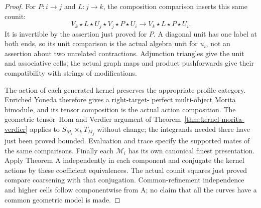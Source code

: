 \documentclass[11pt]{article}
\theoremstyle{definition}
\theoremstyle{remark}
\begin{document}
\begin{proof}
For $P:i\to j$ and $L:j\to k$, the composition comparison inserts
this same counit:
\[
 V_k\star L\star U_j\star V_j\star P\star U_i
       \longrightarrow V_k\star L\star P\star U_i.
\]
It is invertible by the assertion just proved for $P$. A diagonal
unit has one label at both ends, so its unit comparison is the
actual algebra unit for $u_i$, not an assertion about two unrelated
contractions. Adjunction triangles give the unit and associative
cells; the actual graph maps and product pushforwards give their
compatibility with strings of modifications.

The action of each generated kernel preserves the appropriate
profile category. Enriched Yoneda therefore gives a right-target-
perfect multi-object Morita bimodule, and its tensor composition
is the actual action composition. The geometric tensor--Hom and
Verdier argument of Theorem~\ref{thm:kernel-morita-verdier} applies
to $S_{M_i}\times_k T_{M_j}$ without change; the integrands needed
there have just been proved bounded. Evaluation and trace specify
the supported mates of the same comparisons. Finally each
$\mathscr M_i$ has its own canonical finest presentation. Apply
Theorem A independently in each component and conjugate the kernel
actions by these coefficient equivalences. The actual counit squares
just proved compare coarsening with that conjugation. Common-refinement
independence and higher cells follow componentwise from A; no claim
that all the curves have a common geometric model is made.
\end{proof}
\end{document}
